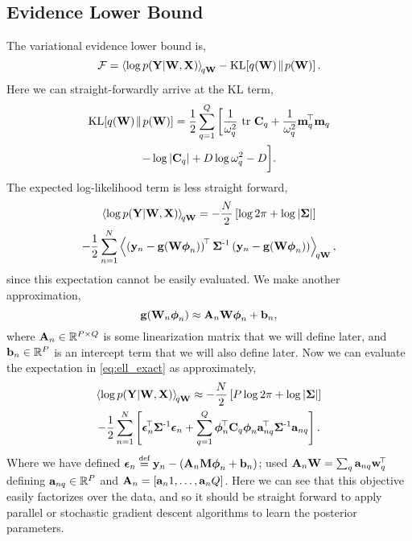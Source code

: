 \subsection{Evidence Lower Bound}
The variational evidence lower bound is,
\begin{equation}
    \Fengy = \expec{q\Weights}{\log \probC{\Outs}{\Weights, \Ins}}
        - \KL{\qrob{\Weights}}{\prob{\Weights}}.
\end{equation}
Here we can straight-forwardly arrive at the KL term,
\begin{multline}
    \KL{\qrob{\Weights}}{\prob{\Weights}}  = 
        \frac{1}{2} \sum^\ltdim_{q=1}
        \bigg[
        \frac{1}{\prvar_q}\trace{\pocov_q}
        + \frac{1}{\prvar_q} \pweights_q\transpose\pweights_q \\
         - \log\deter{\pocov_q} + D \log \prvar_q - D
        \bigg].
    \label{eq:KL}
\end{multline}
%
The expected log-likelihood term is less straight forward,
\begin{multline}
    \expec{q\Weights}{\log \probC{\Outs}{\Weights, \Ins}}  = 
    - \frac{N}{2}
    \sbrac{\log{2\pi} + \log\deter{\Lcov}}  \\
     - \frac{1}{2} \sum^N_{n=1} \expec{q\Weights}{
        \brac{\outs_n - \nonlin{\Weights\feats_n}}\transpose\Lcov\inv
        \brac{\outs_n - \nonlin{\Weights\feats_n}}},
    \label{eq:ell_exact}
\end{multline}
since this expectation cannot be easily evaluated. We make another
approximation,
\begin{equation}
    \nonlin{\Weights_n\feats_n} \approx \Linmat_n \Weights\feats_n + \intcpt_n,
    \label{eq:linapprox}
\end{equation}
where $\Linmat_n \in \real{\otdim \times \ltdim}$ is some linearization matrix
that we will define later, and $\intcpt_n \in \real{\otdim}$ is an intercept
term that we will also define later. Now we can evaluate the expectation in 
\eqref{eq:ell_exact} as approximately,
\begin{multline}
    \expec{q\Weights}{\log \probC{\Outs}{\Weights, \Ins}} \approx
    - \frac{N}{2}\sbrac{P\log{2\pi} + \log\deter{\Lcov}} \\
    - \frac{1}{2} \sum^N_{n=1} 
    \sbrac{
        \errorn \transpose  \Lcov\inv   \errorn  
        + \sum^Q_{q=1} 
            \feats_n\transpose\pocov_q  \feats_n\Linvec_{nq}\transpose\Lcov\inv \Linvec_{nq}
        }.
    \label{eq:ell_approx}
\end{multline}
Where we have defined $\errorn \defeq  \outs_n - (\Linmat_n\pWeights\feats_n + \intcpt_n) $; 
 used $\Linmat_n\Weights = \sum_q \Linvec_{nq}
\weights_q\transpose$ defining
$\Linvec_{nq} \in \real{P}$ and $\Linmat_n = \sbrac{\Linvec_n1, \ldots,
    \Linvec_nQ}$. Here we can see that this objective easily factorizes over the
data, and so it should be straight forward to apply parallel or stochastic
gradient descent algorithms to learn the posterior parameters.


